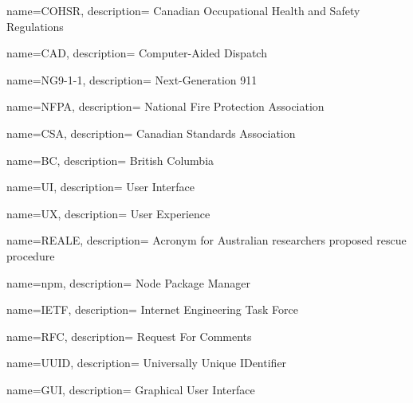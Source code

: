 {
  name={COHSR},
  description={
    Canadian Occupational Health and Safety Regulations
  }
}

{
  name={CAD},
  description={
    Computer-Aided Dispatch
  }
}

{
  name={NG9-1-1},
  description={
    Next-Generation 911
  }
}

{
  name={NFPA},
  description={
    National Fire Protection Association
  }
}

{
  name={CSA},
  description={
    Canadian Standards Association
  }
}

{
  name={BC},
  description={
    British Columbia
  }
}

{
  name={UI},
  description={
    User Interface
  }
}

{
  name={UX},
  description={
    User Experience
  }
}

{
  name={REALE},
  description={
    Acronym for Australian researchers proposed rescue procedure
  }
}

{
  name={npm},
  description={
    Node Package Manager
  }
}

{
  name={IETF},
  description={
    Internet Engineering Task Force
  }
}

{
  name={RFC},
  description={
    Request For Comments
  }
}

{
  name={UUID},
  description={
    Universally Unique IDentifier
  }
}

{
  name={GUI},
  description={
    Graphical User Interface
  }
}
